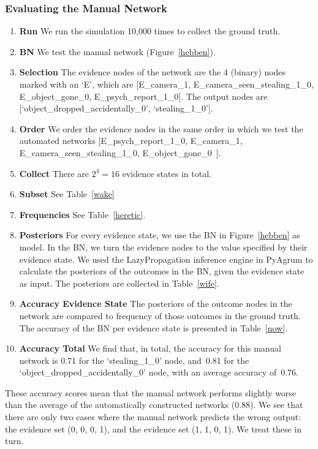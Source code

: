 \documentclass[12pt]{article}
\begin{document}
\subsubsection{Evaluating the Manual Network}

\begin{enumerate}
\item \textbf{Run} We run the simulation 10,000 times to collect the ground truth.
\item \textbf{BN} We test the manual network (Figure~\ref{hebben}).
\item \textbf{Selection} The evidence nodes of the network are the 4 (binary) nodes marked with an `E', which are [E\_camera\_1, E\_camera\_seen\_stealing\_1\_0, E\_object\_gone\_0, E\_psych\_report\_1\_0]. The output nodes are [`object\_dropped\_accidentally\_0', `stealing\_1\_0'].
\item \textbf{Order} We order the evidence nodes in the same order in which we test the automated networks [E\_psych\_report\_1\_0, E\_camera\_1,  E\_camera\_seen\_stealing\_1\_0, E\_object\_gone\_0~].
\item \textbf{Collect} There are $2^4 = 16$ evidence states in total.
\item \textbf{Subset} See Table~\ref{wake}
\item \textbf{Frequencies} See Table~\ref{heretic}.
\item \textbf{Posteriors} For every evidence state, we use the BN in Figure~\ref{hebben} as model. In the BN, we turn the evidence nodes to the value specified by their evidence state. We used the LazyPropagation inference engine in PyAgrum to calculate the posteriors of the outcomes in the BN, given the evidence state as input. The posteriors are collected in Table~\ref{wife}. 
\item \textbf{Accuracy Evidence State} The posteriors of the outcome nodes in the network are compared to frequency of those outcomes in the ground truth. The accuracy of the BN per evidence state is presented in Table~\ref{now}.
\item \textbf{Accuracy Total} We find that, in total, the accuracy for this manual network is 0.71 for the `stealing\_1\_0' node, and~0.81 for the `object\_dropped\_accidentally\_0' node, with an average accuracy of~0.76. 
\end{enumerate}

These accuracy scores mean that the manual network performs slightly worse than the average of the automatically constructed networks (0.88). We see that there are only two cases where the manual network predicts the wrong output: the evidence set (0, 0, 0, 1), and the evidence set (1, 1, 0, 1). We treat these in turn.
\end{document}
